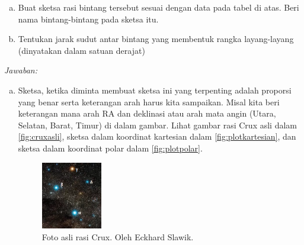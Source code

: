 \documentclass[11pt,fleqn]{exam}
\begin{document}
\begin{questions}
\begin{enumerate}[(a)]
\item Buat sketsa rasi bintang tersebut sesuai dengan data pada tabel di atas. Beri nama bintang-bintang pada sketsa itu.
\item Tentukan jarak sudut antar bintang yang membentuk rangka layang-layang (dinyatakan dalam satuan derajat)
\end{enumerate}

\textit{Jawaban: }

\begin{enumerate}[(a)]
\item Sketsa, ketika diminta membuat sketsa ini yang terpenting adalah proporsi yang benar serta keterangan arah harus kita sampaikan. Misal kita beri keterangan mana arah RA dan deklinasi atau arah mata angin (Utara, Selatan, Barat, Timur) di dalam gambar. Lihat gambar rasi Crux asli dalam \autoref{fig:cruxasli}, sketsa dalam koordinat kartesian dalam \autoref{fig:plotkartesian}, dan sketsa dalam koordinat polar dalam \autoref{fig:plotpolar}. 

\begin{figure}[H]
\centering
\includegraphics[width=0.25\textwidth]{crux_realphoto.png}
\caption{Foto asli rasi Crux. Oleh Eckhard Slawik.}
\label{fig:cruxasli}
\end{figure}


\end{enumerate}
\end{questions}
\end{document}

